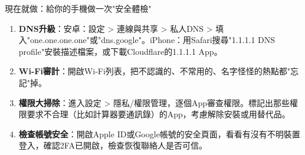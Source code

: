 \begin{tcbpractice}{現在就做：給你的手機做一次"安全體檢"}
\begin{enumerate}
  \item \textbf{DNS升級}：安卓：設定 > 連線與共享 > 私人DNS > 填入"one.one.one.one"或"dns.google"。iPhone：用Safari搜尋"1.1.1.1 DNS profile"安裝描述檔案，或下載Cloudflare的1.1.1.1 App。
  \item \textbf{Wi-Fi審計}：開啟Wi-Fi列表，把不認識的、不常用的、名字怪怪的熱點都"忘記"掉。
  \item \textbf{權限大掃除}：進入設定 > 隱私/權限管理，逐個App審查權限。標記出那些權限要求不合理（比如計算器要通訊錄）的App，考慮解除安裝或用替代品。
  \item \textbf{檢查帳號安全}：開啟Apple ID或Google帳號的安全頁面，看看有沒有不明裝置登入，確認2FA已開啟，檢查恢復聯絡人是否可信。
\end{enumerate}

\end{tcbpractice}
